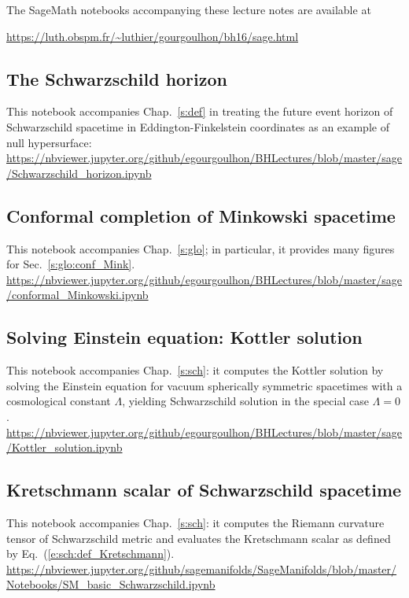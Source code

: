 The SageMath notebooks accompanying these lecture notes are available
at\\

\centerline{
\url{https://luth.obspm.fr/~luthier/gourgoulhon/bh16/sage.html}}

\subsection{The Schwarzschild horizon} \label{s:sam:Schwarz_hor}

This notebook accompanies Chap.~\ref{s:def} in treating the future event horizon of
Schwarzschild spacetime in Eddington-Finkelstein coordinates as an example of null hypersurface:\\[1ex]
{\footnotesize
\url{https://nbviewer.jupyter.org/github/egourgoulhon/BHLectures/blob/master/sage/Schwarzschild_horizon.ipynb}
}

\subsection{Conformal completion of Minkowski spacetime}

This notebook accompanies Chap.~\ref{s:glo}; in particular, it provides
many figures for Sec.~\ref{s:glo:conf_Mink}.\\[1ex]
{\footnotesize
\url{https://nbviewer.jupyter.org/github/egourgoulhon/BHLectures/blob/master/sage/conformal_Minkowski.ipynb}
}

\subsection{Solving Einstein equation: Kottler solution} \label{s:sam:Kottler_solution}

This notebook accompanies Chap.~\ref{s:sch}: it computes the Kottler solution by solving the Einstein
equation for vacuum spherically symmetric spacetimes with a cosmological constant $\Lambda$,
yielding Schwarzschild solution in the special case $\Lambda=0$. \\[1ex]
{\footnotesize
\url{https://nbviewer.jupyter.org/github/egourgoulhon/BHLectures/blob/master/sage/Kottler_solution.ipynb}
}

\subsection{Kretschmann scalar of Schwarzschild spacetime} \label{s:sam:Kretschmann_Schwarz}

This notebook accompanies Chap.~\ref{s:sch}: it computes the Riemann curvature
tensor of Schwarzschild metric and evaluates the Kretschmann scalar as defined
by Eq.~(\ref{e:sch:def_Kretschmann}). \\[1ex]
{\footnotesize
\url{https://nbviewer.jupyter.org/github/sagemanifolds/SageManifolds/blob/master/Notebooks/SM_basic_Schwarzschild.ipynb}
}

